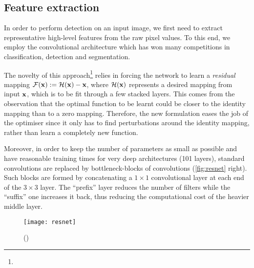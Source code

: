 
	\subsection{Feature extraction}\label{sec:resnet}
		In order to perform detection on an input image, we first need to extract representative high-level features from the raw pixel values. To this end, we employ the \RESNET{} convolutional architecture which has won many competitions in classification, detection and segmentation.

		The novelty of this approach\footnote{} relies in forcing the network to learn a \emph{residual} mapping \(\mathcal{F}(\mathbf{x}) := \mathcal{H}(\mathbf{x}) - \mathbf{x}\), where \(\mathcal{H}(\mathbf{x})\) represents a desired mapping from input \(\mathbf{x}\), which is to be fit through a few stacked layers. This comes from the observation that the optimal function to be learnt could be closer to the identity mapping than to a zero mapping. Therefore, the new formulation eases the job of the optimiser since it only has to find perturbations around the identity mapping, rather than learn a completely new function.

		Moreover, in order to keep the number of parameters as small as possible and have reasonable training times for very deep architectures (101 layers), standard convolutions are replaced by bottleneck-blocks of convolutions (\autoref{fig:resnet} right). Such blocks are formed by concatenating a \(1 \times 1\) convolutional layer at each end of the \(3 \times 3\) layer. The ``prefix'' layer reduces the number of filters while the ``suffix'' one increases it back, thus reducing the computational cost of the heavier middle layer.

		\begin{figure}
			\centering
			\texttt{[image: resnet]}
			\caption[ResNet blocks]{
				(\citet{resnet})
				\label{fig:resnet}
			}
		\end{figure}



